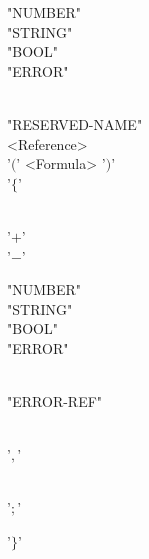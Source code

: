 \documentclass[conference]{IEEEtran}
\begin{document}
\begin{figure}
\begin{grammar}
\begin{syntdiag}[\footnotesize\sdlengths]
\begin{stack}
	\begin{stack} "NUMBER" \\ "STRING" \\ "BOOL" \\ "ERROR"  \end{stack} \\ "RESERVED-NAME" \\ <Reference> \\ '$($' <Formula> '$)$' \\  '$\{$' \begin{rep} \begin{rep}	\begin{stack} \begin{stack} \begin{stack} \\ '$+$' \\ '$-$' \end{stack} "NUMBER" \\ "STRING" \\ "BOOL" \\ "ERROR"  \end{stack} \\ "ERROR-REF" \end{stack} \\  '$,$' \end{rep} \\ '$;$' \end{rep} '$\}$'
	\end{stack}
	\end{syntdiag}
\end{grammar}
\end{figure}
\end{document}
